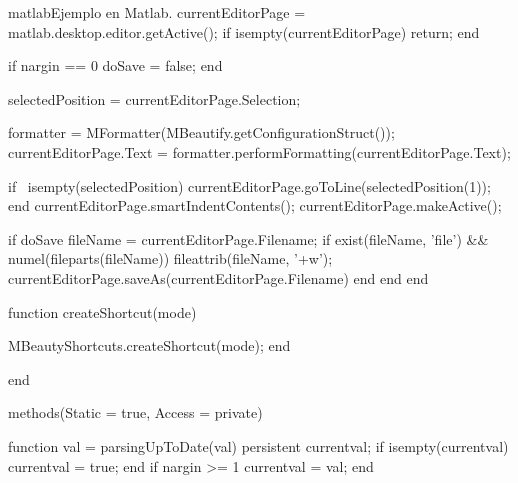 \begin{sourcecode}{matlab}{Ejemplo en Matlab.}
            currentEditorPage = matlab.desktop.editor.getActive();
            if isempty(currentEditorPage)
                return;
            end
            
            if nargin == 0
                doSave = false;
            end
            
            selectedPosition = currentEditorPage.Selection;
            
            formatter = MFormatter(MBeautify.getConfigurationStruct());
            currentEditorPage.Text = formatter.performFormatting(currentEditorPage.Text);
            
            if ~isempty(selectedPosition)
                currentEditorPage.goToLine(selectedPosition(1));
            end
            currentEditorPage.smartIndentContents();
            currentEditorPage.makeActive();
            
            if doSave
                fileName = currentEditorPage.Filename;
                if exist(fileName, 'file') && numel(fileparts(fileName))
                    fileattrib(fileName, '+w');
                    currentEditorPage.saveAs(currentEditorPage.Filename)
                end
            end
        end
        
        function createShortcut(mode)
            
            MBeautyShortcuts.createShortcut(mode);
        end
        
    end
    
    
    methods(Static = true, Access = private)
        
        function val = parsingUpToDate(val)
            persistent currentval;
            if isempty(currentval)
                currentval = true;
            end
            if nargin >= 1
                currentval = val;
            end
            

\end{sourcecode}
